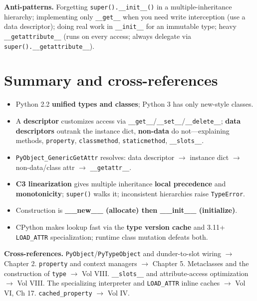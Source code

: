 \textbf{Anti-patterns.} Forgetting \texttt{super().\_\_init\_\_()} in a multiple-inheritance
hierarchy; implementing only \texttt{\_\_get\_\_} when you need write interception (use a data
descriptor); doing real work in \texttt{\_\_init\_\_} for an immutable type; heavy
\texttt{\_\_getattribute\_\_} (runs on every access; always delegate via
\texttt{super().\_\_getattribute\_\_}).

\section{Summary and cross-references}

\begin{itemize}
  \item Python 2.2 \textbf{unified types and classes}; Python 3 has only new-style classes.
  \item A \textbf{descriptor} customizes access via \texttt{\_\_get\_\_}/\texttt{\_\_set\_\_}/\texttt{\_\_delete\_\_};
    \textbf{data descriptors} outrank the instance dict, \textbf{non-data} do not---explaining
    methods, \texttt{property}, \texttt{classmethod}, \texttt{staticmethod}, \texttt{\_\_slots\_\_}.
  \item \texttt{PyObject\_GenericGetAttr} resolves: data descriptor $\rightarrow$ instance dict
    $\rightarrow$ non-data/class attr $\rightarrow$ \texttt{\_\_getattr\_\_}.
  \item \textbf{C3 linearization} gives multiple inheritance \textbf{local precedence} and
    \textbf{monotonicity}; \texttt{super()} walks it; inconsistent hierarchies raise
    \texttt{TypeError}.
  \item Construction is \textbf{\_\_new\_\_ (allocate) then \_\_init\_\_ (initialize)}.
  \item CPython makes lookup fast via the \textbf{type version cache} and 3.11+
    \texttt{LOAD\_ATTR} specialization; runtime class mutation defeats both.
\end{itemize}

\textbf{Cross-references.} \texttt{PyObject}/\texttt{PyTypeObject} and dunder-to-slot wiring
$\rightarrow$ Chapter 2. \texttt{property} and context managers $\rightarrow$ Chapter 5.
Metaclasses and the construction of \texttt{type} $\rightarrow$ Vol VIII. \texttt{\_\_slots\_\_}
and attribute-access optimization $\rightarrow$ Vol VIII. The specializing interpreter and
\texttt{LOAD\_ATTR} inline caches $\rightarrow$ Vol VI, Ch 17. \texttt{cached\_property}
$\rightarrow$ Vol IV.
